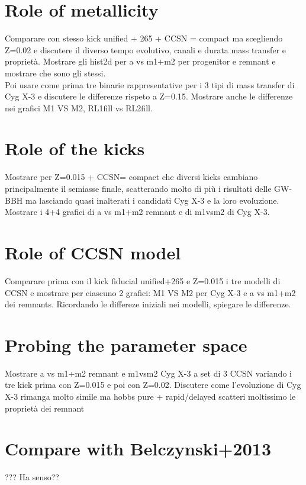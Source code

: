 \documentclass[a4paper,titlepage]{book}     	%
\begin{document}
\section{Role of metallicity}
Comparare con stesso kick unified + 265 + CCSN = compact ma scegliendo Z=0.02 e discutere il diverso tempo evolutivo, canali e durata mass transfer e proprietà.
Mostrare gli hist2d per a vs m1+m2 per progenitor e remnant e mostrare che sono gli stessi.\\
Poi usare come prima tre binarie rappresentative per i 3 tipi di mass transfer di Cyg X-3 e discutere le differenze rispeto a Z=0.15. Mostrare anche le differenze nei grafici M1 VS M2, RL1fill vs RL2fill.


\section{Role of the kicks}
Mostrare per Z=0.015 + CCSN= compact che diversi kicks cambiano principalmente il semiasse finale, scatterando molto di più i risultati delle GW-BBH ma lasciando quasi inalterati i candidati Cyg X-3 e la loro evoluzione. Mostrare i 4+4 grafici di a vs m1+m2 remnant e di m1vsm2 di Cyg X-3.

\section{Role of CCSN model}
Comparare prima con il kick fiducial unified+265 e Z=0.015 i tre modelli di CCSN e mostrare per ciascuno 2 grafici: M1 VS M2 per Cyg X-3 e a vs m1+m2 dei remnants. Ricordando le differeze iniziali nei modelli, spiegare le differenze.


\section{Probing the parameter space}
Mostrare a vs m1+m2 remnant e m1vsm2 Cyg X-3 a set di 3 CCSN variando i tre kick prima con Z=0.015 e poi con Z=0.02. Discutere come l'evoluzione di Cyg X-3 rimanga molto simile ma hobbs pure + rapid/delayed scatteri moltissimo le proprietà dei remnant





\section{Compare with Belczynski+2013}
??? Ha senso??
\end{document}
